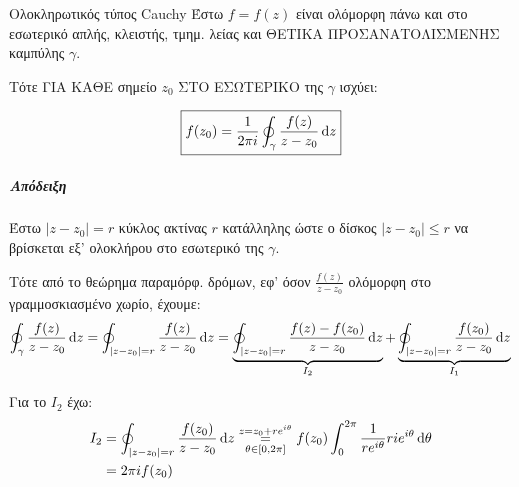 \documentclass[12pt,a4paper,notitlepage,fleqn]{article}
\begin{document}
    \begin{theorem*}[width=.8\textwidth]{Ολοκληρωτικός τύπος Cauchy}
    	\vspace{25pt}
    	Έστω \( f=f(z) \) είναι ολόμορφη πάνω και στο εσωτερικό απλής, κλειστής,
    	τμημ. λείας και { \large ΘΕΤΙΚΑ ΠΡΟΣΑΝΑΤΟΛΙΣΜΕΝΗΣ  } καμπύλης \( \gamma \).

    	Τότε { \large ΓΙΑ ΚΑΘΕ } σημείο \( z_0 \) ΣΤΟ ΕΣΩΤΕΡΙΚΟ της \( \gamma \)
    	ισχύει:

    	\[
    	\boxed{
    		f(z_0) = \frac{1}{2\pi i}\oint_\gamma
    		\frac{f(z)}{z-z_0}\mathop{}\!\mathrm{d} z
    		}
    	\]
    \end{theorem*}
    \subparagraph{Απόδειξη} \hspace{0pt}


    Έστω \( \left|z-z_0\right| =r \) κύκλος ακτίνας \( r \) κατάλληλης ώστε ο δίσκος
    \( \left|z-z_0\right| \leq r \) να βρίσκεται εξ' ολοκλήρου στο εσωτερικό της
    \( \gamma \).

    Τότε από το θεώρημα παραμόρφ. δρόμων, εφ' όσον \( \frac{f(z)}{z-z_0} \) ολόμορφη
    στο γραμμοσκιασμένο χωρίο, έχουμε:
    \[
    \oint_\gamma \frac{f(z)}{z-z_0} \mathop{}\!\mathrm{d} z =
    \oint_{\left|z-z_0\right|=r} \frac{f(z)}{z-z_0}\mathop{}\!\mathrm{d} z
    = \underbrace{\oint_{\left|z-z_0\right|=r} \frac{f(z)-f(z_0)}{z-z_0}\mathop{}\!\mathrm{d} z}_{I_2}
    +\underbrace{\oint_{\left|z-z_0\right|=r} \frac{f(z_0)}{z-z_0}\mathop{}\!\mathrm{d} z}_{I_1}
    \]

    Για το \( I_2 \) έχω:
    \begin{align*}
    I_2 &= \oint_{\left|z-z_0\right|=r} \frac{f(z_0)}{z-z_0}\mathop{}\!\mathrm{d} z
    \overset{z=z_0+re^{i\theta}}{\underset{\theta\in[0,2\pi]}{=}}
    f(z_0)\int_{0}^{2\pi}\frac{1}{re^{i\theta}}rie^{i\theta}\mathop{}\!\mathrm{d}\theta
    \\ &= 2\pi i f(z_0)
    \end{align*}
\end{document}
